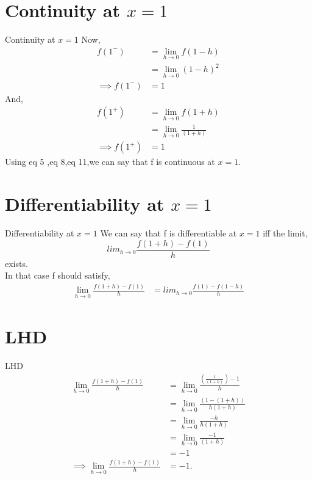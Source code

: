 \documentclass{beamer}
\providecommand{\brak}[1]{\ensuremath{\left(#1\right)}}
\begin{document}
\section{Continuity at $x=1$}
\begin{frame}{Continuity at $x=1$}
Now,
            \begin{align}
                 f\brak{1^-}  &= \lim_{h\to 0}f\brak{1-h} \\
                              &= \lim_{h\to0}\brak{1-h}^2 \\
                 \implies f\brak{1^-} &= 1
            \end{align}
And,
            \begin{align}
                 f\brak{1^+} &= \lim_{h\to0}f\brak{1+h} \\
                             &= \lim_{h\to0}\frac{1}{\brak{1+h}} \\
                 \implies f\brak{1^+} &= 1
            \end{align}
    Using eq 5 ,eq 8,eq 11,we can say that f is continuous at $x = 1$.
\end{frame}


\section{Differentiability at $x=1$}
\begin{frame}{Differentiability at $x=1$}
We can say that f is differentiable at $ x = 1 $ iff the limit,
             \[
                lim_{h \to 0}\frac{f\brak{1 + h} - f\brak{1}}{h}
             \] exists.\\
    In that case f should satisfy,
            \begin{align}
                 \lim_{h \to 0}\frac{f\brak{1 + h} - f\brak{1}}{h}  &=  lim_{h \to 0}\frac{f\brak{1} - f\brak{1-h}}{h} %
            \end{align}
\end{frame}

\section{LHD}
\begin{frame}{LHD}
            \begin{align}
                 \lim_{h \to 0}\frac{f\brak{1 + h} - f\brak{1}}{h} & = \lim_{h \to 0}\frac{\brak{\frac{1}{\brak{1+h}}} - 1}{h}\\
                 & = \lim_{h \to 0}\frac{{\brak{1 - \brak{1 + h}}}}{h\brak{1 + h}}\\
                 & = \lim_{h \to 0}\frac{-h}{h\brak{1 + h}}\\                                       
                 & = \lim_{h \to 0}\frac{-1}{\brak{1 + h}}\\                         
                 & = -1\\
                 \implies \lim_{h \to 0}\frac{f\brak{1 + h} - f\brak{1}}{h} & = -1.
            \end{align}
\end{frame}
\end{document}
